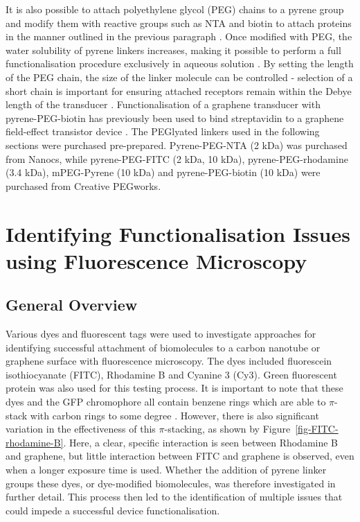 \documentclass[
  a4paper,
]{scrbook}
\begin{document}
It is also possible to attach polyethylene glycol (PEG) chains to a
pyrene group and modify them with reactive groups such as NTA and biotin
to attach proteins in the manner outlined in the previous paragraph
\autocite{Hermanson2013-18,Meran2018}. Once modified with PEG, the water
solubility of pyrene linkers increases, making it possible to perform a
full functionalisation procedure exclusively in aqueous solution
\autocite{Hermanson2013-18}. By setting the length of the PEG chain, the
size of the linker molecule can be controlled - selection of a short
chain is important for ensuring attached receptors remain within the
Debye length of the transducer \autocite{Shkodra2021}. Functionalisation
of a graphene transducer with pyrene-PEG-biotin has previously been used
to bind streptavidin to a graphene field-effect transistor device
\autocite{Miki2019}. The PEGlyated linkers used in the following
sections were purchased pre-prepared. Pyrene-PEG-NTA (2 kDa) was
purchased from Nanocs, while pyrene-PEG-FITC (2 kDa, 10 kDa),
pyrene-PEG-rhodamine (3.4 kDa), mPEG-Pyrene (10 kDa) and
pyrene-PEG-biotin (10 kDa) were purchased from Creative PEGworks.

\hypertarget{sec-impediments}{%
\section{Identifying Functionalisation Issues using Fluorescence
Microscopy}\label{sec-impediments}}

\hypertarget{sec-fluorescence-remarks}{%
\subsection{General Overview}\label{sec-fluorescence-remarks}}

Various dyes and fluorescent tags were used to investigate approaches
for identifying successful attachment of biomolecules to a carbon
nanotube or graphene surface with fluorescence microscopy. The dyes
included fluorescein isothiocyanate (FITC), Rhodamine B and Cyanine 3
(Cy3). Green fluorescent protein was also used for this testing process.
It is important to note that these dyes and the GFP chromophore all
contain benzene rings which are able to \(\pi\)-stack with carbon rings
to some degree
\autocite{Nakayama-Ratchford2007,Tang2012,Khrenova2019,Qiu2019}.
However, there is also significant variation in the effectiveness of
this \(\pi\)-stacking, as shown by Figure~\ref{fig-FITC-rhodamine-B}.
Here, a clear, specific interaction is seen between Rhodamine B and
graphene, but little interaction between FITC and graphene is observed,
even when a longer exposure time is used. Whether the addition of pyrene
linker groups these dyes, or dye-modified biomolecules, was therefore
investigated in further detail. This process then led to the
identification of multiple issues that could impede a successful device
functionalisation.
\end{document}
